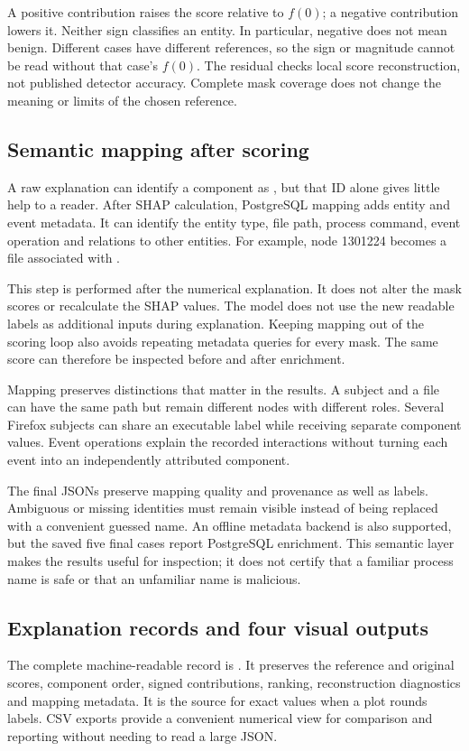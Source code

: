 \documentclass[11pt,a4paper]{article}
\newcommand{\code}[1]{\texttt{\detokenize{#1}}}
\begin{document}
A positive contribution raises the score relative to $f(0)$; a negative
contribution lowers it. Neither sign classifies an entity. In particular,
negative does not mean benign. Different cases have different references, so
the sign or magnitude cannot be read without that case's $f(0)$. The residual
checks local score reconstruction, not published detector accuracy. Complete
mask coverage does not change the meaning or limits of the chosen reference.

\subsection{Semantic mapping after scoring}
A raw explanation can identify a component as \code{node:1301224}, but that ID
alone gives little help to a reader. After SHAP calculation, PostgreSQL mapping
adds entity and event metadata. It can identify the entity type, file path,
process command, event operation and relations to other entities. For example,
node 1301224 becomes a file associated with .

This step is performed after the numerical explanation. It does not alter the
mask scores or recalculate the SHAP values. The model does not use the new
readable labels as additional inputs during explanation. Keeping mapping out
of the scoring loop also avoids repeating metadata queries for every mask.
The same score can therefore be inspected before and after enrichment.

Mapping preserves distinctions that matter in the results. A subject and a file
can have the same path but remain different nodes with different roles. Several
Firefox subjects can share an executable label while receiving separate
component values. Event operations explain the recorded interactions without
turning each event into an independently attributed component.

The final JSONs preserve mapping quality and provenance as well as labels.
Ambiguous or missing identities must remain visible instead of being replaced
with a convenient guessed name. An offline metadata backend is also supported,
but the saved five final cases report PostgreSQL enrichment. This semantic
layer makes the results useful for inspection; it does not certify that a
familiar process name is safe or that an unfamiliar name is malicious.

\subsection{Explanation records and four visual outputs}
The complete machine-readable record is \code{result.json}. It preserves the
reference and original scores, component order, signed contributions, ranking,
reconstruction diagnostics and mapping metadata. It is the source for exact
values when a plot rounds labels. CSV exports provide a convenient numerical
view for comparison and reporting without needing to read a large JSON.
\end{document}
